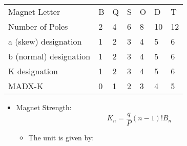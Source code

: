 \documentclass[12pt,a4,]{article}
\numberwithin{equation}{subsection}
\begin{document}
\begin{center}
  \begin{tabular}{lllllll}
  Magnet Letter          & B & Q & S & O & D & T \\
  Number of Poles        & 2 & 4 & 6 & 8 & 10 & 12 \\
  a (skew) designation   & 1 & 2 & 3 & 4 & 5 & 6 \\
  b (normal) designation & 1 & 2 & 3 & 4 & 5 & 6 \\
  K designation          & 1 & 2 & 3 & 4 & 5 & 6 \\
  MADX-K                 & 0 & 1 & 2 & 3 & 4 & 5 \\
  \end{tabular}
\end{center}

\begin{itemize}
\item
  Magnet Strength:
  \begin{equation}K_{n} = \frac{q}{P} (n-1)!B_n\label{eq:magnet_strength}\end{equation}

  \begin{itemize}
  \item
    The unit is given by:


\end{itemize}
\end{itemize}
\end{document}
